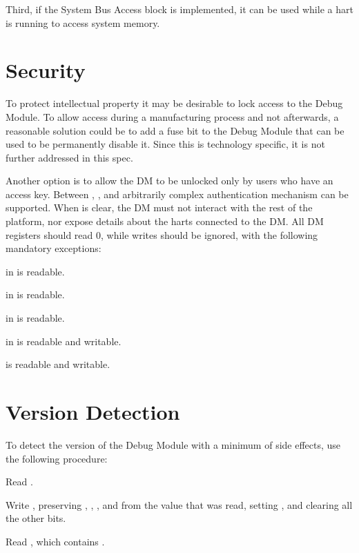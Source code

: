 Third, if the System Bus Access block is implemented, it can be used while a
hart is running to access system memory.

\section{Security}

To protect intellectual property it may be desirable to lock access to the
Debug Module.  To allow access during a manufacturing process and not
afterwards, a reasonable solution could be to add a fuse bit to the Debug
Module that can be used to be permanently disable it. Since this is technology
specific, it is not further addressed in this spec.

Another option is to allow the DM to be unlocked only by users who have an
access key. Between \Fauthenticated, \Fauthbusy, and \Rauthdata arbitrarily
complex authentication mechanism can be supported.  When \Fauthenticated is
clear, the DM must not interact with the rest of the platform, nor expose
details about the harts connected to the DM. All DM registers should read 0,
while writes should be ignored, with the following mandatory exceptions:
\begin{steps}{}
    \item \Fauthenticated in \Rdmstatus is readable.
    \item \Fauthbusy in \Rdmstatus is readable.
    \item \Fversion in \Rdmstatus is readable.
    \item \Fdmactive in \Rdmcontrol is readable and writable.
    \item \Rauthdata is readable and writable.
\end{steps}

\section{Version Detection}

\begin{steps}{To detect the version of the Debug Module with a minimum of side
    effects, use the following procedure:}
    \item Read \Rdmcontrol.
    \item Write \Rdmcontrol, preserving \Fhartreset, \Fhasel, \Fhartsello, and
        \Fhartselhi from the value that was read, setting \Fdmactive, and
        clearing all the other bits.
    \item Read \Rdmstatus, which contains \Fversion.
\end{steps}

